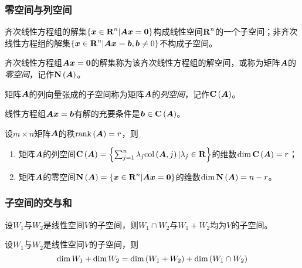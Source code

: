 \documentclass{ctexart}
\begin{document}
\subsubsection*{零空间与列空间}

\begin{theorem}
    齐次线性方程组的解集\(\setof{\vecx\in\rea^n|\mata\vecx=\veczero}\)构成线性空间\(\rea^n\)的一个子空间；非齐次线性方程组的解集\(\setof{\vecx\in\rea^n|\mata\vecx=\vecb,\vecb\neq0}\)不构成子空间。
\end{theorem}

\begin{definition}[零空间]
    齐次线性方程组\(\mata\vecx=\veczero\)的解集称为该齐次线性方程组的解空间，或称为矩阵\(\mata\)的\emph{零空间}，记作\(\nullsp{\mata}\)。
\end{definition}

\begin{definition}[列空间]
    矩阵\(\mata\)的列向量张成的子空间称为矩阵\(\mata\)的\emph{列空间}，记作\(\colsp{\mata}\)。
\end{definition}

\begin{theorem}
    线性方程组\(\mata\vecx=\vecb\)有解的充要条件是\(\vecb\in\colsp{\mata}\)。
\end{theorem}

\begin{theorem}
    设\(m\times n\)矩阵\(\mata\)的秩\(\rank{\mata}=r\)，则
    \begin{enumerate}
        \item 矩阵\(\mata\)的列空间\(\colsp{\mata}=\setof{\sum_{j=1}^n\lambda_j\col{\mata}{j}|\lambda_j\in\rea}\)的维数\(\dim{\colsp{\mata}}=r\)；
        \item 矩阵\(\mata\)的零空间\(\nullsp{\mata}=\setof{\vecx\in\rea^n|\mata\vecx=\veczero}\)的维数\(\dim{\nullsp{\mata}}=n-r\)。
    \end{enumerate}
\end{theorem}

\subsubsection*{子空间的交与和}

\begin{theorem}
    设\(W_1\)与\(W_2\)是线性空间\(V\)的子空间，则\(W_1\cap W_2\)与\(W_1+W_2\)均为\(V\)的子空间。
\end{theorem}

\begin{theorem}[维数公式]
    设\(W_1\)与\(W_2\)是线性空间\(V\)的子空间，则
    \begin{equation*}
        \dim W_1+\dim W_2=\dim\mypar{W_1+W_2}+\dim\mypar{W_1\cap W_2}
    \end{equation*}
\end{theorem}
\end{document}
